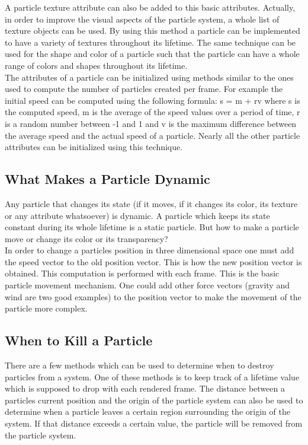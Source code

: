 A particle texture attribute can also be added to this basic attributes. Actually, in order to improve the visual aspects of the particle system, a whole list of texture objects can be used. By using this method a particle can be implemented to have a variety of textures throughout its lifetime. The same technique can be used for the shape and color of a particle such that the particle can have a whole range of colors and shapes throughout its lifetime.\\

The attributes of a particle can be initialized using methods similar to the ones used to compute the number of particles created per frame. For example the initial speed can be computed using the following formula: s = m + rv where s is the computed speed, m is the average of the speed values over a period of time, r is a random number between -1 and 1 and v is the maximum difference between the average speed and the actual speed of a particle. Nearly all the other particle attributes can be initialized using this technique.\\

\newpage
\subsection{What Makes a Particle Dynamic}
Any particle that changes its state (if it moves, if it changes its color, its texture or any attribute whatsoever) is dynamic. A particle which keeps its state constant during its whole lifetime is a static particle. But how to make a particle move or change its color or its transparency?\\

In order to change a particles position in three dimensional space one must add the speed vector to the old position vector. This is how the new position vector is obtained. This computation is performed with each frame. This is the basic particle movement mechanism. One could add other force vectors (gravity and wind are two good examples) to the position vector to make the movement of the particle more complex.\\

\newpage
\subsection{When to Kill a Particle}
There are a few methods which can be used to determine when to destroy particles from a system. One of these methods is to keep track of a lifetime value which is supposed to drop with each rendered frame. The distance between a particles current position and the origin of the particle system can also be used to determine when a particle leaves a certain region surrounding the origin of the system. If that distance exceeds a certain value, the particle will be removed from the particle system.\\

